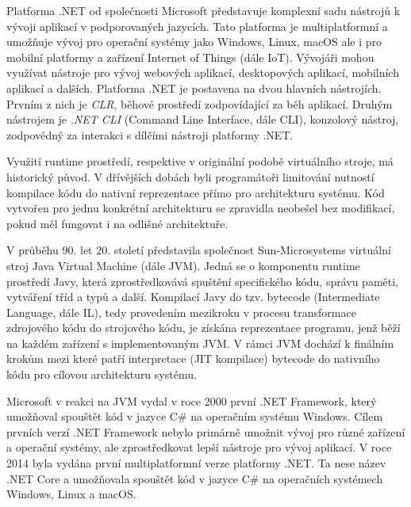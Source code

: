 

Platforma .NET od společnosti Microsoft představuje komplexní sadu nástrojů k vývoji aplikací v podporovaných jazycích. Tato platforma je multiplatformní a umožňuje vývoj pro operační systémy jako Windows, Linux, macOS ale i pro mobilní platformy a zařízení Internet of Things (dále IoT). Vývojáři mohou využívat nástroje pro vývoj webových aplikací, desktopových aplikací, mobilních aplikací a dalších. Platforma .NET je postavena na dvou hlavních nástrojích. Prvním z nich je \textit{CLR}, běhové prostředí zodpovídající za běh aplikací. Druhým nástrojem je \textit{.NET CLI} (Command Line Interface, dále CLI), konzolový nástroj, zodpovědný za interakci s dílčími nástroji platformy .NET.


Využití runtime prostředí, respektive v originální podobě virtuálního stroje, má historický původ. V dřívějších dobách byli programátoři limitování nutností kompilace kódu do nativní reprezentace přímo pro architekturu systému. Kód vytvořen pro jednu konkrétní architekturu se zpravidla neobešel bez modifikací, pokud měl fungovat i na odlišné architektuře.

V průběhu 90. let 20. století představila společnost Sun-Microsystems virtuální stroj Java Virtual Machine (dále JVM). Jedná se o komponentu runtime prostředí Javy, která zprostředkovává spuštění specifického kódu, správu paměti, vytváření tříd a typů a další. Kompilací Javy do tzv. bytecode (Intermediate Language, dále IL), tedy provedením mezikroku v procesu transformace zdrojového kódu do strojového kódu, je získána reprezentace programu, jenž běží na každém zařízení s implementovaným JVM. V rámci JVM dochází k finálním krokům mezi které patří interpretace (JIT kompilace) bytecode do nativního kódu pro cílovou architekturu systému. 

Microsoft v reakci na JVM vydal v roce 2000 první .NET Framework, který umožňoval spouštět kód v jazyce C\# na operačním systému Windows. Cílem prvních verzí .NET Framework nebylo primárně umožnit vývoj pro různé zařízení a operační systémy, ale zprostředkovat lepší nástroje pro vývoj aplikací. V roce 2014 byla vydána první multiplatformní verze platformy .NET. Ta nese název .NET Core a umožňovala spouštět kód v jazyce C\# na operačních systémech Windows, Linux a macOS. 

